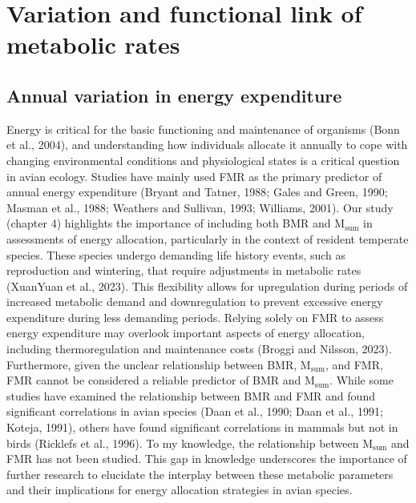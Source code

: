 \documentclass[10pt, twoside]{book} %
\begin{document}
\section{Variation and functional link of metabolic rates}

\subsection{Annual variation in energy expenditure}
Energy is critical for the basic functioning and maintenance of organisms (Bonn et al., 2004), and understanding how individuals allocate it annually to cope with changing environmental conditions and physiological states is a critical question in avian ecology. Studies have mainly used FMR as the primary predictor of annual energy expenditure (Bryant and Tatner, 1988; Gales and Green, 1990; Masman et al., 1988; Weathers and Sullivan, 1993; Williams, 2001). Our study (chapter 4) highlights the importance of including both BMR and M$_{\text{sum}}$ in assessments of energy allocation, particularly in the context of resident temperate species. These species undergo demanding life history events, such as reproduction and wintering, that require adjustments in metabolic rates (XuanYuan et al., 2023). This flexibility allows for upregulation during periods of increased metabolic demand and downregulation to prevent excessive energy expenditure during less demanding periods. Relying solely on FMR to assess energy expenditure may overlook important aspects of energy allocation, including thermoregulation and maintenance costs (Broggi and Nilsson, 2023). Furthermore, given the unclear relationship between BMR, M$_{\text{sum}}$, and FMR, FMR cannot be considered a reliable predictor of BMR and M$_{\text{sum}}$. While some studies have examined the relationship between BMR and FMR and found significant correlations in avian species (Daan et al., 1990; Daan et al., 1991; Koteja, 1991), others have found significant correlations in mammals but not in birds (Ricklefs et al., 1996). To my knowledge, the relationship between M$_{\text{sum}}$ and FMR has not been studied. This gap in knowledge underscores the importance of further research to elucidate the interplay between these metabolic parameters and their implications for energy allocation strategies in avian species. \\
\end{document}
